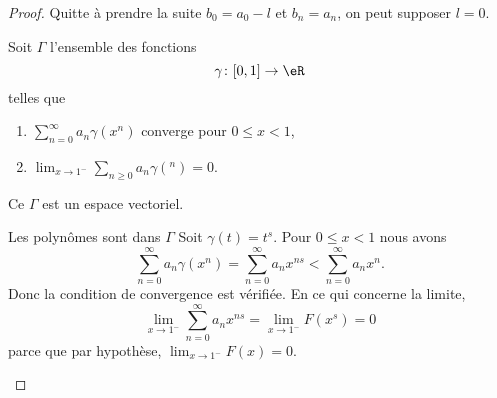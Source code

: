 \begin{proof}
    Quitte à prendre la suite \( b_0=a_0-l\) et \( b_n=a_n\), on peut supposer \( l=0\).

    Soit \( \Gamma\) l'ensemble des fonctions
    \begin{equation}
         \gamma\colon \mathopen[ 0 , 1 \mathclose]\to \eR
    \end{equation}
    telles que
    \begin{enumerate}
        \item
            $\sum_{n=0}^{\infty}a_n\gamma(x^n)$ converge pour \( 0\leq x<1\),
        \item
            \( \lim_{x\to 1^-} \sum_{n\geq 0}a_n\gamma(^n)=0\).
    \end{enumerate}
    Ce \( \Gamma\) est un espace vectoriel.
    \begin{subproof}
    \item[Les polynômes sont dans \( \Gamma\)]
        Soit \( \gamma(t)=t^s\). Pour \( 0\leq x<1\) nous avons
        \begin{equation}
            \sum_{n=0}^{\infty}a_n\gamma(x^n)=\sum_{n=0}^{\infty}a_nx^{ns}<\sum_{n=0}^{\infty}a_nx^n.
        \end{equation}
        Donc la condition de convergence est vérifiée. En ce qui concerne la limite,
        \begin{equation}
            \lim_{x\to 1^-} \sum_{n=0}^{\infty}a_nx^{ns}=\lim_{x\to 1^-} F(x^s)=0
        \end{equation}
        parce que par hypothèse, \( \lim_{x\to 1^-} F(x)=0\).


\end{subproof}
\end{proof}
